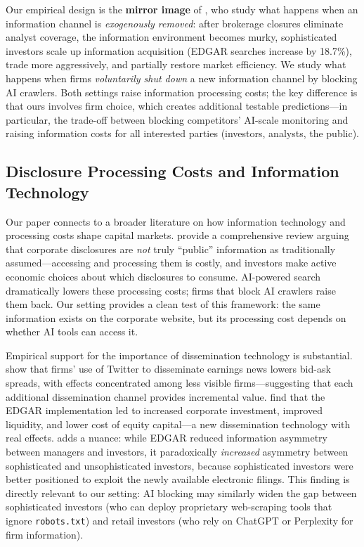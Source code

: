 \documentclass[12pt,a4paper]{article}
\begin{document}
Our empirical design is the \textbf{mirror image} of \citet{ChenKellyWu2020}, who study what happens when an information channel is \emph{exogenously removed}: after brokerage closures eliminate analyst coverage, the information environment becomes murky, sophisticated investors scale up information acquisition (EDGAR searches increase by 18.7\%), trade more aggressively, and partially restore market efficiency. We study what happens when firms \emph{voluntarily shut down} a new information channel by blocking AI crawlers. Both settings raise information processing costs; the key difference is that ours involves firm choice, which creates additional testable predictions---in particular, the trade-off between blocking competitors' AI-scale monitoring and raising information costs for all interested parties (investors, analysts, the public).

\subsection{Disclosure Processing Costs and Information Technology}

Our paper connects to a broader literature on how information technology and processing costs shape capital markets. \citet{BlankespoorDeHaanMarinovic2020} provide a comprehensive review arguing that corporate disclosures are \emph{not} truly ``public'' information as traditionally assumed---accessing and processing them is costly, and investors make active economic choices about which disclosures to consume. AI-powered search dramatically lowers these processing costs; firms that block AI crawlers raise them back. Our setting provides a clean test of this framework: the same information exists on the corporate website, but its processing cost depends on whether AI tools can access it.

Empirical support for the importance of dissemination technology is substantial. \citet{BlankespoorMillerWhite2014} show that firms' use of Twitter to disseminate earnings news lowers bid-ask spreads, with effects concentrated among less visible firms---suggesting that each additional dissemination channel provides incremental value. \citet{GoldsteinYangZuo2023} find that the EDGAR implementation led to increased corporate investment, improved liquidity, and lower cost of equity capital---a new dissemination technology with real effects. \citet{Gomez2024} adds a nuance: while EDGAR reduced information asymmetry between managers and investors, it paradoxically \emph{increased} asymmetry between sophisticated and unsophisticated investors, because sophisticated investors were better positioned to exploit the newly available electronic filings. This finding is directly relevant to our setting: AI blocking may similarly widen the gap between sophisticated investors (who can deploy proprietary web-scraping tools that ignore \texttt{robots.txt}) and retail investors (who rely on ChatGPT or Perplexity for firm information).
\end{document}
